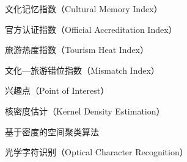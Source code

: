 
\begin{denotation}[4cm]
  \item[CMI] 文化记忆指数（Cultural Memory Index）
  \item[OAI] 官方认证指数（Official Accreditation Index）
  \item[THI] 旅游热度指数（Tourism Heat Index）
  \item[MI] 文化—旅游错位指数（Mismatch Index）
  \item[POI] 兴趣点（Point of Interest）
  \item[KDE] 核密度估计（Kernel Density Estimation）
  \item[DBSCAN] 基于密度的空间聚类算法
  \item[OCR] 光学字符识别（Optical Character Recognition）
\end{denotation}
